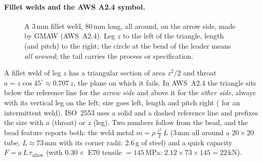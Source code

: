 \paragraph{Fillet welds and the AWS A2.4 symbol.}
\begin{figure}[!htbp]
\centering
{}
\caption{A 3\,mm fillet weld, 80\,mm long, all around, on the arrow side, made by GMAW (AWS~A2.4). Leg $z$ to the left
of the triangle, length (and pitch) to the right; the circle at the bend of the leader means \emph{all around}; the
tail carries the process or specification.}
\label{fig:mod07-weld}
\end{figure}
A fillet weld of leg $z$ has a triangular section of area $z^2/2$ and throat $a = z\cos45^\circ \approx 0.707\,z$, the
plane on which it fails. In AWS~A2.4 the triangle sits below the reference line for the \emph{arrow side} and above it
for the \emph{other side}, always with its vertical leg on the left; size goes left, length and pitch right
( for an intermittent weld). ISO~2553 uses a solid and a dashed reference line and prefixes the size with
$a$ (throat) or $z$ (leg). Two numbers follow from the bead, and the bead feature reports both: the weld metal
$m = \rho\,\tfrac{z^2}{2}\,L$ (3\,mm all around a $20\times20$ tube, $L\approx73$\,mm with its corner radii:
2.6\,g of steel) and a quick capacity $F = a\,L\,\tau_{\text{allow}}$ (with $0.30\times$ E70 tensile $= 145$\,MPa:
$2.12\times73\times145 = 22$\,kN).

